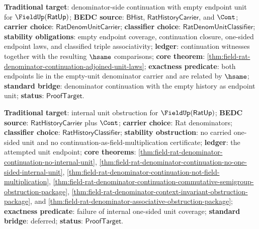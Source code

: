 \textbf{Traditional target}: denominator-side continuation with empty endpoint
unit for $\FieldUp(\mathsf{RatUp})$; \textbf{BEDC source}:
$\mathsf{BHist}$, $\mathsf{RatHistoryCarrier}$, and $\Cont$; \textbf{carrier
choice}: $\mathsf{RatDenomUnitCarrier}$; \textbf{classifier choice}:
$\mathsf{RatDenomUnitClassifier}$; \textbf{stability obligations}: empty
endpoint coverage, continuation closure, one-sided endpoint laws, and
classified triple associativity; \textbf{ledger}: continuation witnesses
together with the resulting $\hsame$ comparisons; \textbf{core theorem}:
\autoref{thm:field-rat-denominator-continuation-adjoined-unit-laws};
\textbf{exactness predicate}: both endpoints lie in the empty-unit denominator
carrier and are related by $\hsame$; \textbf{standard bridge}: denominator
continuation with the empty history as endpoint unit; \textbf{status}:
$\mathsf{ProofTarget}$.

\textbf{Traditional target}: internal unit obstruction for
$\FieldUp(\mathsf{RatUp})$; \textbf{BEDC source}: $\mathsf{RatHistoryCarrier}$
plus $\Cont$; \textbf{carrier choice}: Rat denominators; \textbf{classifier
choice}: $\mathsf{RatHistoryClassifier}$; \textbf{stability obstruction}: no
carried one-sided unit and no continuation-as-field-multiplication certificate;
\textbf{ledger}: the attempted unit endpoint; \textbf{core theorems}:
\autoref{thm:field-rat-denominator-continuation-no-internal-unit},
\autoref{thm:field-rat-denominator-continuation-no-one-sided-internal-unit},
\autoref{thm:field-rat-denominator-continuation-not-field-multiplication},
\autoref{thm:field-rat-denominator-continuation-commutative-semigroup-obstruction-package},
\autoref{thm:field-rat-denominator-context-invariant-obstruction-package},
and
\autoref{thm:field-rat-denominator-associative-obstruction-package};
\textbf{exactness predicate}: failure of internal one-sided unit coverage;
\textbf{standard bridge}: deferred; \textbf{status}: $\mathsf{ProofTarget}$.

